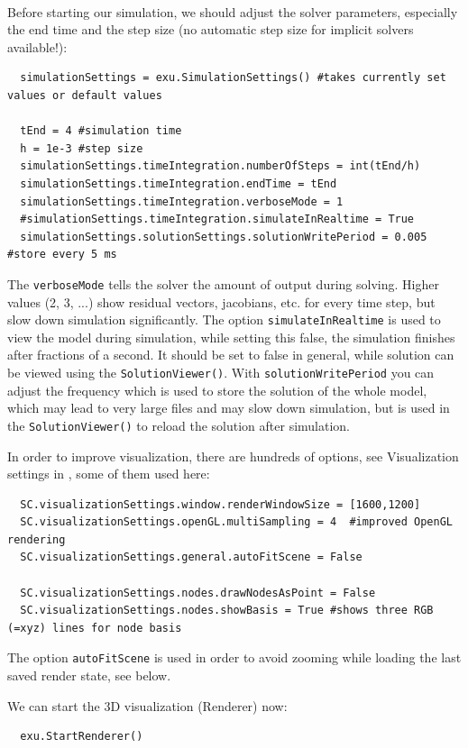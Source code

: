 \horizontalRuler\\
\noindent Before starting our simulation, we should adjust the solver parameters, especially the end time and the step size (no automatic step size for implicit solvers available!):
\pythonstyle\begin{lstlisting}
  simulationSettings = exu.SimulationSettings() #takes currently set values or default values

  tEnd = 4 #simulation time
  h = 1e-3 #step size
  simulationSettings.timeIntegration.numberOfSteps = int(tEnd/h)
  simulationSettings.timeIntegration.endTime = tEnd
  simulationSettings.timeIntegration.verboseMode = 1
  #simulationSettings.timeIntegration.simulateInRealtime = True
  simulationSettings.solutionSettings.solutionWritePeriod = 0.005 #store every 5 ms
\end{lstlisting}
The \texttt{verboseMode} tells the solver the amount of output during solving. Higher values (2, 3, ...) show residual vectors, jacobians, etc. for every time step, but slow down simulation significantly.
The option \texttt{simulateInRealtime} is used to view the model during simulation, while setting this false, 
the simulation finishes after fractions of a second. It should be set to false in general, 
while solution can be viewed using the \texttt{SolutionViewer()}.
With \texttt{solutionWritePeriod} you can adjust the frequency which is used to store the solution of the whole model, 
which may lead to very large files and may slow down simulation, but is used in the \texttt{SolutionViewer()} to reload the solution after simulation.

\noindent In order to improve visualization, there are hundreds of options, see Visualization settings in , some of them used here:
\pythonstyle\begin{lstlisting}
  SC.visualizationSettings.window.renderWindowSize = [1600,1200]
  SC.visualizationSettings.openGL.multiSampling = 4  #improved OpenGL rendering
  SC.visualizationSettings.general.autoFitScene = False

  SC.visualizationSettings.nodes.drawNodesAsPoint = False
  SC.visualizationSettings.nodes.showBasis = True #shows three RGB (=xyz) lines for node basis
\end{lstlisting}
The option \texttt{autoFitScene} is used in order to avoid zooming while loading the last saved render state, see below.

\noindent We can start the 3D visualization (Renderer) now:
\pythonstyle\begin{lstlisting}
  exu.StartRenderer()
\end{lstlisting}


